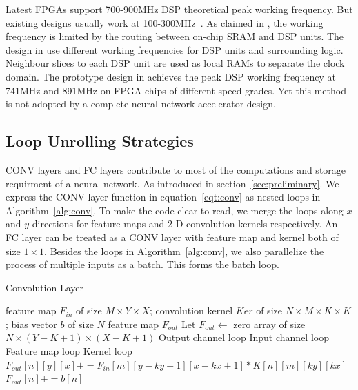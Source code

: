 Latest FPGAs support 700-900MHz DSP theoretical peak working frequency. But existing designs usually work at 100-300MHz~\cite{qiu2016going, guo2017angel, zhang2016caffeine, ma2017optimizing}. As claimed in \cite{wu2017high}, the working frequency is limited by the routing between on-chip SRAM and DSP units. The design in \cite{wu2017high} use different working frequencies for DSP units and surrounding logic. Neighbour slices to each DSP unit are used as local RAMs to separate the clock domain. The prototype design in \cite{wu2017high} achieves the peak DSP working frequency at 741MHz and 891MHz on FPGA chips of different speed grades. Yet this method is not adopted by a complete neural network accelerator design. 

\subsection{Loop Unrolling Strategies}\label{sec:hardware:lu}
CONV layers and FC layers contribute to most of the computations and storage requirment of a neural network. As introduced in section~\ref{sec:preliminary}. We express the CONV layer function in equation~\ref{eqt:conv} as nested loops in Algorithm~\ref{alg:conv}. To make the code clear to read, we merge the loops along $x$ and $y$ directions for feature maps and 2-D convolution kernels respectively. An FC layer can be treated as a CONV layer with feature map and kernel both of size $1\times 1$. Besides the loops in Algorithm~\ref{alg:conv}, we also parallelize the process of multiple inputs as a batch. This forms the batch loop.

\begin{algorithm}  
    \caption{Convolution Layer}
    \label{alg:conv}
    \begin{algorithmic}[1]
        \Require feature map $F_{in}$ of size $M\times Y\times X$; 
                 convolution kernel $Ker$ of size $N\times M\times K\times K$;
                 bias vector $b$ of size $N$ 
        \Ensure  feature map $F_{out}$
            \State Let $F_{out} \gets $ zero array of size $N\times(Y-K+1)\times(X-K+1)$  
             \Comment Output channel loop
                 \Comment Input channel loop
                     \Comment Feature map loop
                         \Comment Kernel loop
                            \State $F_{out}[n][y][x] += F_{in}[m][y-ky+1][x-kx+1] * K[n][m][ky][kx]$
                        \EndFor
                    \EndFor
                \EndFor
                \State $F_{out}[n] += b[n]$
            \EndFor
            \State {}
        \EndFunction  
        
    \end{algorithmic}  
\end{algorithm}

